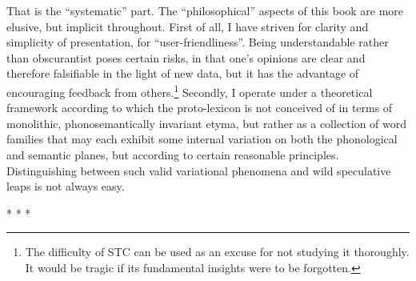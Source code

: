 That is the ``systematic'' part. The ``philosophical'' aspects of this book are more elusive, but implicit throughout. First of all, I have striven for clarity and simplicity of presentation, for ``user-friendliness''. Being understandable rather than obscurantist poses certain risks, in that one's opinions are clear and therefore falsifiable in the light of new data, but it has the advantage of encouraging feedback from others.\footnote{The difficulty of STC can be used as an excuse for not studying it thoroughly. It would be tragic if its fundamental insights were to be forgotten.} Secondly, I operate under a theoretical framework according to which the proto-lexicon is not conceived of in terms of monolithic, phonosemantically invariant etyma, but rather as a collection of word families that may each exhibit some internal variation on both the phonological and semantic planes, but according to certain reasonable principles. Distinguishing between such valid variational phenomena and wild speculative leaps is not always easy.

* * *

